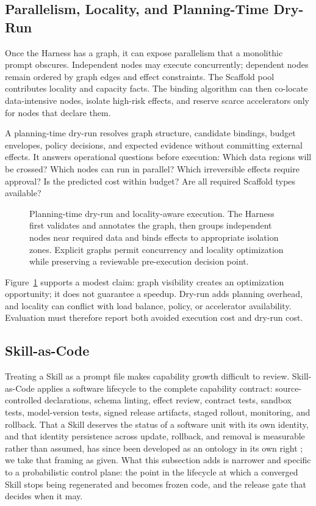 \subsection{Parallelism, Locality, and Planning-Time Dry-Run}

Once the Harness has a graph, it can expose parallelism that a monolithic prompt obscures. Independent nodes may execute concurrently; dependent nodes remain ordered by graph edges and effect constraints. The Scaffold pool contributes locality and capacity facts. The binding algorithm can then co-locate data-intensive nodes, isolate high-risk effects, and reserve scarce accelerators only for nodes that declare them.

A planning-time dry-run resolves graph structure, candidate bindings, budget envelopes, policy decisions, and expected evidence without committing external effects. It answers operational questions before execution: Which data regions will be crossed? Which nodes can run in parallel? Which irreversible effects require approval? Is the predicted cost within budget? Are all required Scaffold types available?

\begin{figure}[t]
\centering
\caption{Planning-time dry-run and locality-aware execution. The Harness first validates and annotates the graph, then groups independent nodes near required data and binds effects to appropriate isolation zones. Explicit graphs permit concurrency and locality optimization while preserving a reviewable pre-execution decision point.}
\label{fig:dry-run}
\end{figure}

Figure~\ref{fig:dry-run} supports a modest claim: graph visibility creates an optimization opportunity; it does not guarantee a speedup. Dry-run adds planning overhead, and locality can conflict with load balance, policy, or accelerator availability. Evaluation must therefore report both avoided execution cost and dry-run cost.

\subsection{Skill-as-Code}
\label{sec:skill-as-code}

Treating a Skill as a prompt file makes capability growth difficult to review. Skill-as-Code applies a software lifecycle to the complete capability contract: source-controlled declarations, schema linting, effect review, contract tests, sandbox tests, model-version tests, signed release artifacts, staged rollout, monitoring, and rollback. That a Skill deserves the status of a software unit with its own identity, and that identity persistence across update, rollback, and removal is measurable rather than assumed, has since been developed as an ontology in its own right \cite{fan2026skillware}; we take that framing as given. What this subsection adds is narrower and specific to a probabilistic control plane: the point in the lifecycle at which a converged Skill stops being regenerated and becomes frozen code, and the release gate that decides when it may.

